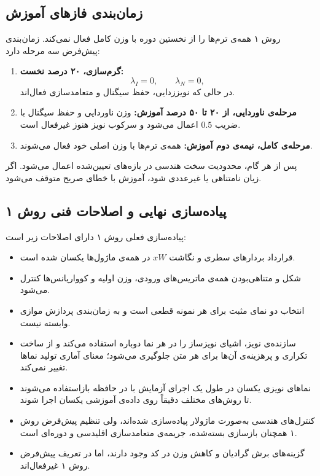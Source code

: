 \documentclass[a4paper,12pt]{article}
\newcommand{\EN}[1]{\lr{#1}}
\newcommand{\QR}{\lr{QR}}
\begin{document}
\subsection{زمان‌بندی فازهای آموزش}

روش ۱ همه‌ی ترم‌ها را از نخستین دوره با وزن کامل فعال نمی‌کند. زمان‌بندی پیش‌فرض سه مرحله دارد:

\begin{enumerate}[label=\arabic*)]
 \item \textbf{گرم‌سازی، ۲۰ درصد نخست:}
 \begin{equation}
 \lambda_I=0,
 \qquad
 \lambda_N=0,
 \end{equation}
 در حالی که نویززدایی، حفظ سیگنال و متعامدسازی فعال‌اند.

 \item \textbf{مرحله‌ی ناوردایی، از ۲۰ تا ۵۰ درصد آموزش:}
 وزن ناوردایی و حفظ سیگنال با ضریب $0.5$ اعمال می‌شود و سرکوب نویز هنوز غیرفعال است.

 \item \textbf{مرحله‌ی کامل، نیمه‌ی دوم آموزش:}
 همه‌ی ترم‌ها با وزن اصلی خود فعال می‌شوند.
\end{enumerate}

پس از هر گام، محدودیت سخت هندسی در بازه‌های تعیین‌شده اعمال می‌شود. اگر زیان نامتناهی یا غیرعددی شود، آموزش با خطای صریح متوقف می‌شود.

\subsection{پیاده‌سازی نهایی و اصلاحات فنی روش ۱}

پیاده‌سازی فعلی روش ۱ دارای اصلاحات زیر است:

\begin{itemize}
 \item قرارداد بردارهای سطری و نگاشت $xW$ در همه‌ی ماژول‌ها یکسان شده است.
 \item شکل و متناهی‌بودن همه‌ی ماتریس‌های ورودی، وزن اولیه و کوواریانس‌ها کنترل می‌شود.
 \item انتخاب دو نمای مثبت برای هر نمونه قطعی است و به زمان‌بندی پردازش موازی وابسته نیست.
 \item سازنده‌ی نویز، اشیای نویزساز را در هر نما دوباره استفاده می‌کند و از ساخت تکراری و پرهزینه‌ی آن‌ها برای هر متن جلوگیری می‌شود؛ معنای آماری تولید نماها تغییر نمی‌کند.
 \item نماهای نویزی یکسان در طول یک اجرای آزمایش با \EN{TrainingViewStore} در حافظه بازاستفاده می‌شوند تا روش‌های مختلف دقیقاً روی داده‌ی آموزشی یکسان اجرا شوند.
 \item کنترل‌های هندسی به‌صورت ماژولار پیاده‌سازی شده‌اند، ولی تنظیم پیش‌فرض روش ۱ همچنان بازسازی بسته‌شده، جریمه‌ی متعامدسازی اقلیدسی و \QR{} دوره‌ای است.
 \item گزینه‌های برش گرادیان و کاهش وزن در کد وجود دارند، اما در تعریف پیش‌فرض روش ۱ غیرفعال‌اند.
\end{itemize}
\end{document}
